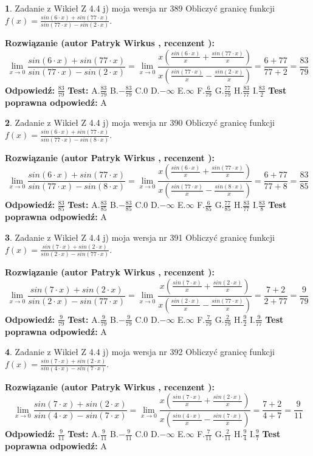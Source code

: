 \documentclass[12pt, a4paper]{article}
\theoremstyle{definition} %
\newtheorem{zad}{}
\newcommand{\zadStart}[1]{\begin{zad}#1\newline}
\newcommand{\zadStop}{\end{zad}}
\newcommand{\rozwStart}[2]{\noindent \textbf{Rozwiązanie (autor #1 , recenzent #2): }\newline}
\newcommand{\rozwStop}{\newline}
\newcommand{\odpStart}{\noindent \textbf{Odpowiedź:}\newline}
\newcommand{\odpStop}{\newline}
\newcommand{\testStart}{\noindent \textbf{Test:}\newline}
\newcommand{\testStop}{\newline}
\newcommand{\kluczStart}{\noindent \textbf{Test poprawna odpowiedź:}\newline}
\newcommand{\kluczStop}{\newline}
\begin{document}
\zadStart{Zadanie z Wikieł Z 4.4 j) moja wersja nr 389}
Obliczyć granicę funkcji $f(x)=\frac{sin(6\cdot x) +sin(77\cdot x)}{sin(77\cdot x) -sin(2\cdot x)}$.
\zadStop
\rozwStart{Patryk Wirkus}{}
$$\lim\limits_{x\to 0}\frac{sin(6\cdot x) +sin(77\cdot x)}{sin(77\cdot x) -sin(2\cdot x)}=\lim\limits_{x\to 0}\frac{x(\frac{sin(6\cdot x)}{x}+\frac{sin(77\cdot x)}{x})}{x(\frac{sin(77\cdot x)}{x}-\frac{sin(2\cdot x)}{x})}=\frac{6+77}{77+2} = \frac{83}{79}$$
\rozwStop
\odpStart
$\frac{83}{79}$
\odpStop
\testStart
A.$\frac{83}{79}$
B.$-\frac{83}{79}$
C.$0$
D.$-\infty$
E.$\infty$
F.$\frac{6}{79}$
G.$\frac{77}{79}$
H.$\frac{83}{77}$
I.$\frac{83}{2}$
\testStop
\kluczStart
A
\kluczStop



\zadStart{Zadanie z Wikieł Z 4.4 j) moja wersja nr 390}
Obliczyć granicę funkcji $f(x)=\frac{sin(6\cdot x) +sin(77\cdot x)}{sin(77\cdot x) -sin(8\cdot x)}$.
\zadStop
\rozwStart{Patryk Wirkus}{}
$$\lim\limits_{x\to 0}\frac{sin(6\cdot x) +sin(77\cdot x)}{sin(77\cdot x) -sin(8\cdot x)}=\lim\limits_{x\to 0}\frac{x(\frac{sin(6\cdot x)}{x}+\frac{sin(77\cdot x)}{x})}{x(\frac{sin(77\cdot x)}{x}-\frac{sin(8\cdot x)}{x})}=\frac{6+77}{77+8} = \frac{83}{85}$$
\rozwStop
\odpStart
$\frac{83}{85}$
\odpStop
\testStart
A.$\frac{83}{85}$
B.$-\frac{83}{85}$
C.$0$
D.$-\infty$
E.$\infty$
F.$\frac{6}{85}$
G.$\frac{77}{85}$
H.$\frac{83}{77}$
I.$\frac{83}{8}$
\testStop
\kluczStart
A
\kluczStop



\zadStart{Zadanie z Wikieł Z 4.4 j) moja wersja nr 391}
Obliczyć granicę funkcji $f(x)=\frac{sin(7\cdot x) +sin(2\cdot x)}{sin(2\cdot x) -sin(77\cdot x)}$.
\zadStop
\rozwStart{Patryk Wirkus}{}
$$\lim\limits_{x\to 0}\frac{sin(7\cdot x) +sin(2\cdot x)}{sin(2\cdot x) -sin(77\cdot x)}=\lim\limits_{x\to 0}\frac{x(\frac{sin(7\cdot x)}{x}+\frac{sin(2\cdot x)}{x})}{x(\frac{sin(2\cdot x)}{x}-\frac{sin(77\cdot x)}{x})}=\frac{7+2}{2+77} = \frac{9}{79}$$
\rozwStop
\odpStart
$\frac{9}{79}$
\odpStop
\testStart
A.$\frac{9}{79}$
B.$-\frac{9}{79}$
C.$0$
D.$-\infty$
E.$\infty$
F.$\frac{7}{79}$
G.$\frac{2}{79}$
H.$\frac{9}{2}$
I.$\frac{9}{77}$
\testStop
\kluczStart
A
\kluczStop



\zadStart{Zadanie z Wikieł Z 4.4 j) moja wersja nr 392}
Obliczyć granicę funkcji $f(x)=\frac{sin(7\cdot x) +sin(2\cdot x)}{sin(4\cdot x) -sin(7\cdot x)}$.
\zadStop
\rozwStart{Patryk Wirkus}{}
$$\lim\limits_{x\to 0}\frac{sin(7\cdot x) +sin(2\cdot x)}{sin(4\cdot x) -sin(7\cdot x)}=\lim\limits_{x\to 0}\frac{x(\frac{sin(7\cdot x)}{x}+\frac{sin(2\cdot x)}{x})}{x(\frac{sin(4\cdot x)}{x}-\frac{sin(7\cdot x)}{x})}=\frac{7+2}{4+7} = \frac{9}{11}$$
\rozwStop
\odpStart
$\frac{9}{11}$
\odpStop
\testStart
A.$\frac{9}{11}$
B.$-\frac{9}{11}$
C.$0$
D.$-\infty$
E.$\infty$
F.$\frac{7}{11}$
G.$\frac{2}{11}$
H.$\frac{9}{4}$
I.$\frac{9}{7}$
\testStop
\kluczStart
A
\kluczStop
\end{document}
